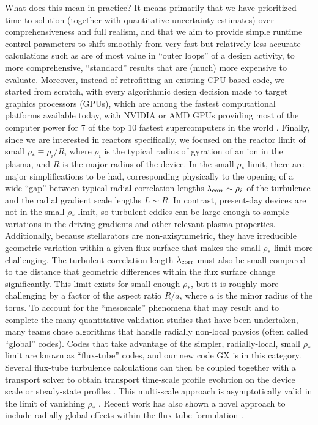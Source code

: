\documentclass{jpp}
\newcommand{\GX}{{GX}\xspace}
\begin{document}
What does this mean in practice? It means primarily that we have prioritized time to solution (together with quantitative uncertainty estimates) over comprehensiveness and full realism, and that we aim to provide simple runtime control parameters to shift smoothly from very fast but relatively less accurate calculations such as are of most value in ``outer loops'' of a design activity, to more comprehensive, ``standard'' results that are (much) more expensive to evaluate. Moreover, instead of retrofitting an existing CPU-based code, we started from scratch, with every algorithmic design decision made to target graphics processors (GPUs), which are {\color{black} among} the fastest computational platforms available today{\color{black}, with NVIDIA or AMD GPUs providing most of the computer power for 7 of the top 10 fastest supercomputers in the world \citep{Strohmaier2022}}. Finally, since we are interested in reactors specifically, we focused on the reactor limit of small $\rho_* \equiv \rho_i/R$, where $\rho_i$ is the typical radius of gyration of an ion in the plasma, and $R$ is the major radius of the device. In the small $\rho_*$ limit, there are major simplifications to be had, corresponding physically to the opening of a wide ``gap'' between typical radial correlation lengths $\lambda_{\rm corr}\sim\rho_i$ of the turbulence and the radial gradient scale lengths $L\sim R$. In contrast, present-day devices are not in the small $\rho_*$ limit, so turbulent eddies can be large enough to sample variations in the driving gradients and other relevant plasma properties. {\color{black} Additionally, because stellarators are non-axisymmetric, they have irreducible geometric variation within a given flux surface that makes the small $\rho_*$ limit more challenging. The turbulent correlation length $\lambda_{\rm corr}$ must also be small compared to the distance that geometric differences within the flux surface change significantly. This limit exists for small enough $\rho_*$, but it is roughly more challenging by a factor of the aspect ratio $R/a$, where $a$ is the minor radius of the torus.} To account for the ``mesoscale'' phenomena that may result and to complete the many quantitative validation studies that have been undertaken, many teams chose algorithms that handle radially non-local physics (often called ``global'' codes). Codes that take advantage of the simpler, radially-local, small $\rho_*$ limit are known as ``flux-tube'' codes, and our new code \GX is in this category. Several flux-tube turbulence calculations can then be coupled together with a transport solver to obtain transport time-scale profile evolution on the device scale \citep{Barnes2009} {\color{black} or steady-state profiles \citep{Candy2009}}. This multi-scale approach is asymptotically valid in the limit of vanishing $\rho_*$ {\color{black} \citep{Abel2013}}. {\color{black} Recent work has also shown a novel approach to include radially-global effects within the flux-tube formulation \citep{Parra2015,St-Onge2022}.}
\end{document}
